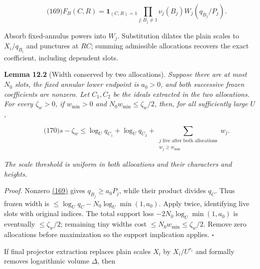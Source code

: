 \hypertarget{ma:frozen}{}

\label{ma:frozen}

\[
\qquad\text{(169)}
 F_B(C,R)=\mathbf1_{(C,R)=1}
       \prod_{j:B_j\ne1}\nu_j(B_j)W_j(q_{B_j}/P_j).
\]

Absorb fixed-annulus powers into \(W_j\). Substitution dilates the plain scales to \(X_i/q_{B_i}\) and punctures at \(RC\); summing admissible allocations recovers the exact coefficient, including dependent slots.

\textbf{Lemma 12.2} (Width conserved by two allocations). \emph{\hypertarget{ma:width}{}\label{ma:width} Suppose there are at most \(N_0\) slots, the fixed annular lower endpoint is \(a_0>0\), and both successive frozen coefficients are nonzero. Let \(C_1,C_2\) be the ideals extracted in the two allocations. For every \(\zeta_w>0\), if \(w_{\min}>0\) and \(N_0w_{\min}\le\zeta_w/2\), then, for all sufficiently large \(U\), \hypertarget{ma:width-conservation}{}\label{ma:width-conservation}}

\[
\qquad\text{(170)}
 s-\zeta_w\le
      \log_Uq_{C_1}+\log_Uq_{C_2}
       +\sum_{\substack{j\text{ live after both allocations}\\w_j\ge w_{\min}}}w_j.
\]

\emph{The scale threshold is uniform in both allocations and their characters and heights.}

\emph{Proof.} Nonzero \protect\hyperlink{ma:frozen}{(169)} gives \(q_{B_j}\ge a_0P_j\), while their product divides \(q_C\). Thus frozen width is \(\le\log_Uq_C-N_0\log_U\min(1,a_0)\). Apply twice, identifying live slots with original indices. The total support loss \(-2N_0\log_U\min(1,a_0)\) is eventually \(\le\zeta_w/2\); remaining tiny widths cost \(\le N_0w_{\min}\le\zeta_w/2\). Remove zero allocations before maximization so the support implication applies. \(\square\)

If final projector extraction replaces plain scales \(X_i\) by \(X_i/U^{r_i}\) and formally removes logarithmic volume \(\Delta\), then

\hypertarget{ma:clipping}{}

\label{ma:clipping}

\par\noindent\resizebox{\linewidth}{!}{\begin{minipage}{\dimexpr\linewidth+75.99155pt\relax}\[
\qquad\text{(171)}
 \sum_{i=1}^2\max(0,\log_UX_i-r_i)
       +\sum_{j\ \mathrm{live}}w_j
 =\sum_{i=1}^2\max(0,\log_UX_i)+\sum_jw_j
       -\left[\Delta+\sum_i(-\log_UX_i)_+
                       -\sum_i(r_i-\log_UX_i)_+\right].
\]\end{minipage}}\par

